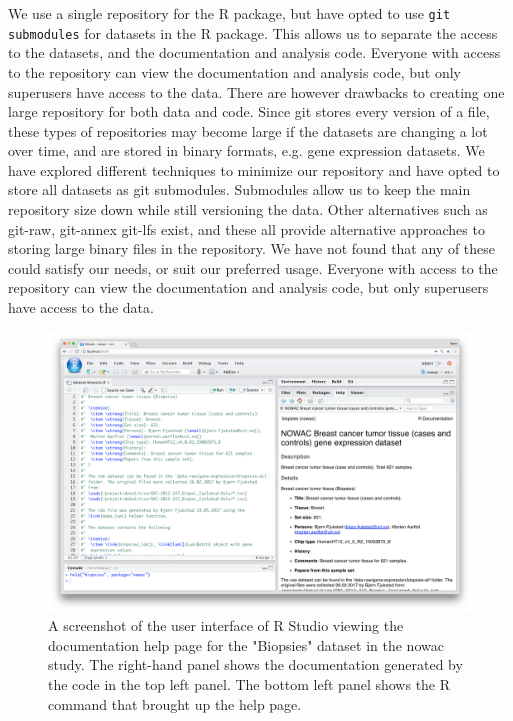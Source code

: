 We use a single repository for the R package, but have opted to use \texttt{git
submodules} for datasets in the R package.  This allows us to separate the
access to the datasets, and the documentation and analysis code. Everyone with
access to the repository can view the documentation and analysis code, but only
superusers have access to the data.  There are however drawbacks to creating one
large repository for both data and code. Since git stores every version of a
file, these types of repositories may become large if the datasets are changing
a lot over time, and are stored in binary formats, e.g. gene expression
datasets. We have explored different techniques to minimize our repository and
have opted to store all datasets as git
submodules\cite{submodule}. Submodules allow us to keep the main repository size
down while still versioning the data. Other alternatives such as
git-raw\cite{gitraw}, git-annex\cite{gitannex} git-lfs\cite{gitlfs} exist, and
these all provide alternative approaches to storing large binary files in the
repository. We have not found that any of these could satisfy our needs, or suit
our preferred usage.  Everyone with access to the repository can view the
documentation and analysis code, but only superusers have access to the data.

\begin{figure}
  \includegraphics[width=\linewidth]{figures/rpkg.png}
  \caption{A screenshot of the user interface of R Studio viewing the
    documentation help page for the "Biopsies" dataset in the \gls{nowac} study.
    The right-hand panel shows the documentation generated by the code in the
    top left panel. The bottom left panel shows the R command that brought up
    the help page.}
    \label{rpkgfig} 
\end{figure}

